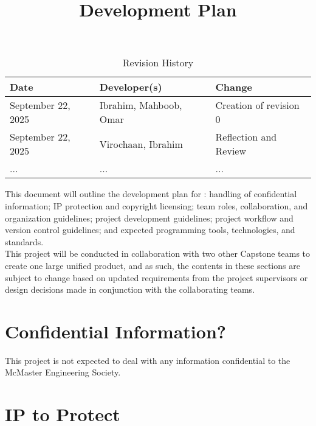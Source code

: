 \documentclass{article}
\title{Development Plan\\\progname}
\author{\authname}
\date{}
\begin{document}
\maketitle
\begin{table}[hp]
\caption{Revision History} \label{TblRevisionHistory}
\begin{tabularx}{\textwidth}{llX}
\toprule
\textbf{Date} & \textbf{Developer(s)} & \textbf{Change}\\
\midrule
September 22, 2025 & Ibrahim, Mahboob, Omar & Creation of revision 0\\
September 22, 2025 & Virochaan, Ibrahim & Reflection and Review\\
... & ... & ...\\
\bottomrule
\end{tabularx}
\end{table}

\newpage{}

This document will outline the development plan for \textbf{\teamname}:
handling of confidential information; IP protection and copyright licensing;
team roles, collaboration, and organization guidelines; project development
guidelines; project workflow and version control guidelines; and expected
programming tools, technologies, and standards.\\

This project will be conducted in collaboration with two other Capstone teams
to create one large unified product, and as such, the contents in these
sections are subject to change based on updated requirements from the project
supervisors or design decisions made in conjunction with the collaborating
teams.

\begin{comment}
\wss{Additional information on the development plan can be found in the
\href{https://gitlab.cas.mcmaster.ca/courses/capstone/-/blob/main/Lectures/L02b_POCAndDevPlan/POCAndDevPlan.pdf?ref_type=heads}
{lecture slides}.}
\end{comment}

\section{Confidential Information?}
\begin{flushleft}
This project is not expected to deal with any information confidential to the McMaster Engineering Society. 
\end{flushleft}

\section{IP to Protect}
\end{document}
